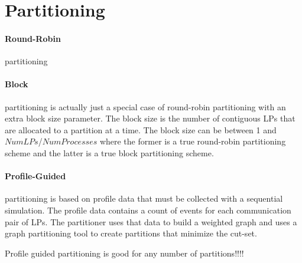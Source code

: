 \documentclass[11pt]{book}
\begin{document}
\section{Partitioning}

\paragraph{Round-Robin} partitioning

\paragraph{Block} partitioning is actually just a special case of round-robin partitioning with an extra
block size parameter. The block size is the number of contiguous LPs that are allocated to a
partition at a time. The block size can be between 1 and $NumLPs$/$NumProcesses$ where the
former is a true round-robin partitioning scheme and the latter is a true block partitioning
scheme.

\paragraph{Profile-Guided} partitioning is based on profile data that must be collected with a
sequential simulation. The profile data contains a count of events for each communication pair
of LPs. The partitioner uses that data to build a weighted graph and uses a graph partitioning
tool to create partitions that minimize the cut-set.

Profile guided partitioning is good for any number of partitions!!!!
\end{document}
